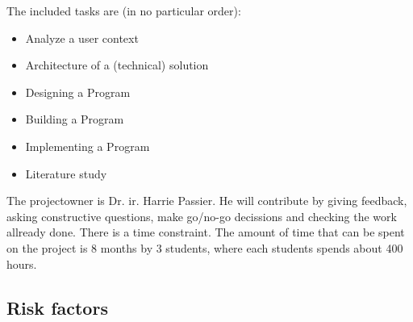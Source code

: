 \documentclass{article}
\begin{document}
The included tasks are (in no particular order):
\begin{itemize}
  \item Analyze a user context
  \item Architecture of a (technical) solution
  \item Designing a Program
  \item Building a Program
  \item Implementing a Program
  \item Literature study
\end{itemize}

The projectowner is Dr. ir. Harrie Passier. He will contribute by giving feedback, asking constructive questions, make go/no-go decissions and checking the work allready done. There is a time constraint. The amount of time that can be spent on the project is 8 months by 3 students, where each students spends about 400 hours. 

\subsection{Risk factors}
\end{document}
